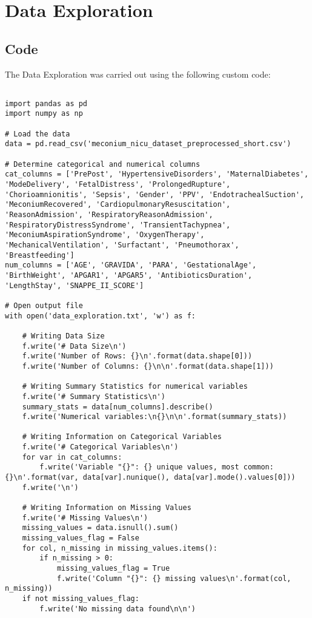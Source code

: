 \documentclass[11pt]{article}
\begin{document}
\section{Data Exploration} \subsection{Code}The Data Exploration was carried out using the following custom code:

\begin{verbatim}

import pandas as pd
import numpy as np

# Load the data
data = pd.read_csv('meconium_nicu_dataset_preprocessed_short.csv')

# Determine categorical and numerical columns
cat_columns = ['PrePost', 'HypertensiveDisorders', 'MaternalDiabetes', 'ModeDelivery', 'FetalDistress', 'ProlongedRupture', 'Chorioamnionitis', 'Sepsis', 'Gender', 'PPV', 'EndotrachealSuction', 'MeconiumRecovered', 'CardiopulmonaryResuscitation', 'ReasonAdmission', 'RespiratoryReasonAdmission', 'RespiratoryDistressSyndrome', 'TransientTachypnea', 'MeconiumAspirationSyndrome', 'OxygenTherapy', 'MechanicalVentilation', 'Surfactant', 'Pneumothorax', 'Breastfeeding']
num_columns = ['AGE', 'GRAVIDA', 'PARA', 'GestationalAge', 'BirthWeight', 'APGAR1', 'APGAR5', 'AntibioticsDuration', 'LengthStay', 'SNAPPE_II_SCORE']

# Open output file
with open('data_exploration.txt', 'w') as f:

    # Writing Data Size
    f.write('# Data Size\n')
    f.write('Number of Rows: {}\n'.format(data.shape[0]))
    f.write('Number of Columns: {}\n\n'.format(data.shape[1]))

    # Writing Summary Statistics for numerical variables
    f.write('# Summary Statistics\n')
    summary_stats = data[num_columns].describe()
    f.write('Numerical variables:\n{}\n\n'.format(summary_stats))

    # Writing Information on Categorical Variables
    f.write('# Categorical Variables\n')
    for var in cat_columns:
        f.write('Variable "{}": {} unique values, most common: {}\n'.format(var, data[var].nunique(), data[var].mode().values[0]))
    f.write('\n')

    # Writing Information on Missing Values
    f.write('# Missing Values\n')
    missing_values = data.isnull().sum()
    missing_values_flag = False
    for col, n_missing in missing_values.items():
        if n_missing > 0:
            missing_values_flag = True
            f.write('Column "{}": {} missing values\n'.format(col, n_missing))
    if not missing_values_flag:
        f.write('No missing data found\n\n')


\end{verbatim}
\end{document}
